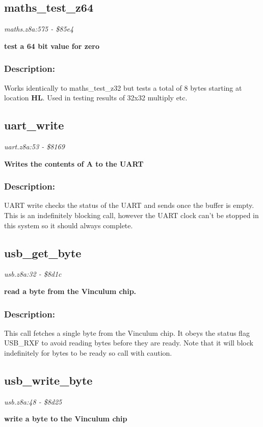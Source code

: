 \subsection{maths\_test\_z64}
\textit{maths.z8a:575 - \$85e4}

\noindent
\textbf{test a 64 bit value for zero}

\subsubsection{Description:}
 Works identically to maths\_test\_z32 but tests a total of 8 bytes starting at location \textbf{HL}.  Used in testing results of 32x32 multiply etc.

\subsection{uart\_write}
\textit{uart.z8a:53 - \$8169}

\noindent
\textbf{Writes the contents of A to the UART}

\subsubsection{Description:}
 UART write checks the status of the UART and sends once the buffer is empty. This is an indefinitely blocking call, however the UART clock can't be stopped in this system so it should always complete.

\subsection{usb\_get\_byte}
\textit{usb.z8a:32 - \$8d1c}

\noindent
\textbf{read a byte from the Vinculum chip.}

\subsubsection{Description:}
 This call fetches a single byte from the Vinculum chip.  It obeys the status flag USB\_RXF to avoid reading bytes before they are ready.  Note that it will block indefinitely for bytes to be ready so call with caution.

\subsection{usb\_write\_byte}
\textit{usb.z8a:48 - \$8d25}

\noindent
\textbf{write a byte to the Vinculum chip}

